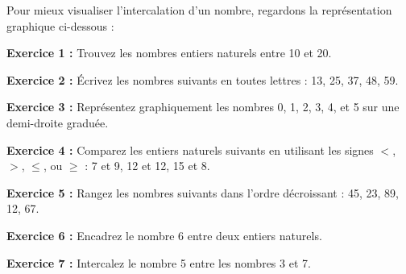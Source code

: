 \documentclass{article}
\begin{document}
Pour mieux visualiser l'intercalation d'un nombre, regardons la représentation graphique ci-dessous :

\begin{center}
\end{center}

\vspace{0.5cm}

\begin{tcolorbox}[colback=orange!10!white, colframe=yellow!80!black, title=\textcolor{white}{Exercices}, 
                  sharp corners=south]
    \textbf{Exercice 1 :} Trouvez les nombres entiers naturels entre 10 et 20.

    \vspace{0.2cm}

    \textbf{Exercice 2 :} Écrivez les nombres suivants en toutes lettres : 13, 25, 37, 48, 59.

    \vspace{0.2cm}

    \textbf{Exercice 3 :} Représentez graphiquement les nombres 0, 1, 2, 3, 4, et 5 sur une demi-droite graduée.

    \vspace{0.2cm}

    \textbf{Exercice 4 :} Comparez les entiers naturels suivants en utilisant les signes \(<\), \(>\), \(\leq\), ou \(\geq\) : 7 et 9, 12 et 12, 15 et 8.

    \vspace{0.2cm}

    \textbf{Exercice 5 :} Rangez les nombres suivants dans l'ordre décroissant : 45, 23, 89, 12, 67.

    \vspace{0.2cm}

    \textbf{Exercice 6 :} Encadrez le nombre 6 entre deux entiers naturels.

    \vspace{0.2cm}

    \textbf{Exercice 7 :} Intercalez le nombre 5 entre les nombres 3 et 7.
\end{tcolorbox}
\end{document}
